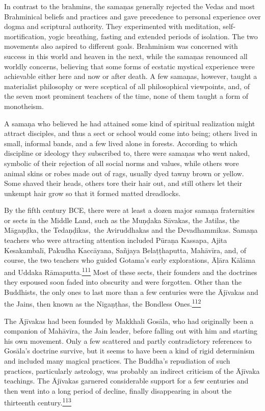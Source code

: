 In contrast to the brahmins, the samaṇas generally rejected the Vedas
and most Brahminical beliefs and practices and gave precedence to
personal experience over dogma and scriptural authority. They
experimented with meditation, self-mortification, yogic breathing,
fasting and extended periods of isolation. The two movements also
aspired to different goals. Brahminism was concerned with success in
this world and heaven in the next, while the samaṇas renounced all
worldly concerns, believing that some forms of ecstatic mystical
experience were achievable either here and now or after death. A few
samaṇas, however, taught a materialist philosophy or were sceptical of
all philosophical viewpoints, and, of the seven most prominent teachers
of the time, none of them taught a form of monotheism.

A samaṇa who believed he had attained some kind of spiritual realization
might attract disciples, and thus a sect or school would come into
being; others lived in small, informal bands, and a few lived alone in
forests. According to which discipline or ideology they subscribed to,
there were samaṇas who went naked, symbolic of their rejection of all
social norms and values, while others wore animal skins or robes made
out of rags, usually dyed tawny brown or yellow. Some shaved their
heads, others tore their hair out, and still others let their unkempt
hair grow so that it formed matted dreadlocks.

By the fifth century BCE, there were at least a dozen major samaṇa
fraternities or sects in the Middle Land, such as the Muṇḍaka Sāvakas,
the Jatilas, the Māgaṇḍka, the Tedaṇḍikas,~the Aviruddhakas and the
Devadhammikas. Samaṇa teachers who were attracting attention included
Pūraṇa Kassapa, Ajita Kesakambalī, Pakudha Kaccāyana, Sañjaya
Belaṭṭhaputta, Mahāvīra, and, of course, the two teachers who guided
Gotama's early explorations, Āḷāra Kālāma and Uddaka
Rāmaputta.\label{footprints_split_007.html_fnref111}\hyperref[footprints_split_024.htmlux5cux23fn111]{\textsuperscript{111}}
Most of these sects, their founders and the doctrines they espoused soon
faded into obscurity and were forgotten. Other than the Buddhists, the
only ones to last more than a few centuries were the Ājīvakas and the
Jains, then known as the Nigaṇṭhas, the Bondless
Ones.\label{footprints_split_007.html_fnref112}\hyperref[footprints_split_024.htmlux5cux23fn112]{\textsuperscript{112}}

The Ājīvakas had been founded by Makkhali Gosāla, who had originally
been a companion of Mahāvīra, the Jain leader, before falling out with
him and starting his own movement. Only a few scattered and partly
contradictory references to Gosāla's doctrine survive, but it seems to
have been a kind of rigid determinism and included many magical
practices. The Buddha's repudiation of such practices, particularly
astrology, was probably an indirect criticism of the Ājīvaka teachings.
The Ājīvakas garnered considerable support for a few centuries and then
went into a long period of decline, finally disappearing in about the
thirteenth
century.\label{footprints_split_007.html_fnref113}\hyperref[footprints_split_024.htmlux5cux23fn113]{\textsuperscript{113}}

